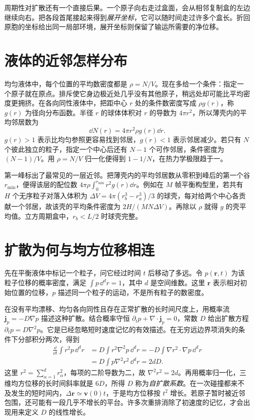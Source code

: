 周期性对扩散还有一个直接后果。一个原子向右走过盒面，会从相邻复制盒的左边继续向右。把各段首尾接起来得到\emph{展开坐标}，它可以随时间走过许多个盒长。折回原胞的坐标给出同一局部环境，展开坐标则保留了输运所需要的净位移。

\section{液体的近邻怎样分布}\label{transport:pair-structure}
均匀液体中，每个位置的平均数密度都是 $\rho=N/V$。现在多给一个条件：指定一个原子就在原点。排斥使它身边极近处几乎没有其他原子，稍远处却可能比平均密度更拥挤。在各向同性液体中，把距中心 $r$ 处的条件数密度写成 $\rho g(r)$，称 $g(r)$ 为径向分布函数。半径 $r$ 的球体体积对 $r$ 的导数为 $4\pi r^2$，所以薄壳内的平均邻居数为
\begin{equation}
\dd N(r)=4\pi r^2\rho g(r)\dd r.
\end{equation}
$g(r)>1$ 表示比均匀参照更容易找到邻居，$g(r)<1$ 表示邻居减少。若只有 $N$ 个彼此独立的粒子，指定一个中心后还有 $N-1$ 个可作邻居，条件密度为 $(N-1)/V$。用 $\rho=N/V$ 归一化便得到 $1-1/N$，在热力学极限趋于一。

第一峰标出了最常见的一层近邻。把薄壳内的平均邻居数从零积到峰后的第一个谷 $r_{\min}$，便得该层的配位数 $4\pi\rho\int_0^{r_{\min}}r^2g(r)\dd r$。例如在 $M$ 帧平衡构型里，若共有 $H$ 个无序粒子对落入体积为 $\Delta V=4\pi(r_b^3-r_a^3)/3$ 的球壳，每对给两个中心各贡献一个邻居，故该壳的平均条件密度为 $2H/(MN\Delta V)$。再除以 $\rho$ 就得 $g$ 的壳平均值。立方周期盒中，$r_b<L/2$ 时球壳完整。

\section{扩散为何与均方位移相连}
先在平衡液体中标记一个粒子，问它经过时间 $t$ 后移动了多远。令 $p(\bm r,t)$ 为该粒子位移的概率密度，满足 $\int p\,\dd^dr=1$，其中 $d$ 是空间维数。这里 $\bm r$ 表示相对初始位置的位移，$p$ 描述同一个粒子的运动，不是所有粒子的数密度。

在没有平均漂移、均匀各向同性且存在正常扩散的长时间尺度上，用概率流 $\bm j_p=-D\nabla p$ 描述这种扩散。结合概率守恒 $\partial_t p+\nabla\cdot\bm j_p=0$，常数 $D$ 给出扩散方程 $\partial_t p=D\nabla^2p$。它是已经忽略短时速度记忆的有效描述。在无穷远边界项消失的条件下分部积分两次，得到
\begin{align}
\frac{\dd}{\dd t}\int r^2p\,\dd^dr
&=D\int r^2\nabla^2p\,\dd^dr
=-D\int\nabla r^2\cdot\nabla p\,\dd^dr\\
&=D\int p\nabla^2r^2\,\dd^dr=2dD.
\end{align}
这里 $r^2=\sum_{\alpha=1}^d r_\alpha^2$，每项的二阶导数为二，故 $\nabla^2r^2=2d$。再用概率归一化，三维均方位移的长时间斜率就是 $6D$，所得 $D$ 称为\emph{自扩散系数}。在一次碰撞都来不及发生的短时间内，$\Delta\bm r\simeq\bm v(0)t$，于是均方位移按 $t^2$ 增长。若原子暂时被近邻包围，还可能有一段几乎不增长的平台。许多次重排消除了初速度的记忆，才会出现用来定义 $D$ 的线性增长。

